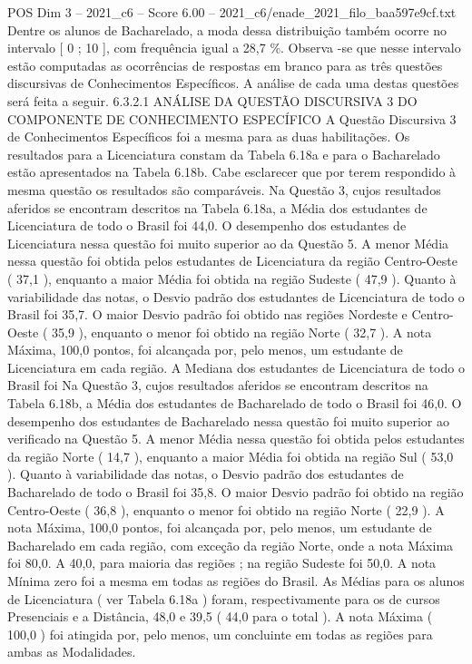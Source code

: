 \begin{textsample}{POS Dim 3 – 2021\_c6 – Score 6.00 – 2021\_c6/enade\_2021\_filo\_baa597e9cf.txt}
Dentre os alunos de Bacharelado, a moda dessa distribuição também ocorre no intervalo [ 0 ; 10 ], com frequência igual a 28,7 \%.
Observa -se que nesse intervalo estão computadas as ocorrências de respostas em branco para as três questões discursivas de Conhecimentos Específicos.
A análise de cada uma destas questões será feita a seguir. 6.3.2.1 ANÁLISE DA QUESTÃO DISCURSIVA 3 DO COMPONENTE DE CONHECIMENTO ESPECÍFICO A Questão Discursiva 3 de Conhecimentos Específicos foi a mesma para as duas habilitações.
Os resultados para a Licenciatura constam da Tabela 6.18a e para o Bacharelado estão apresentados na Tabela 6.18b.
Cabe esclarecer que por terem respondido à mesma questão os resultados são comparáveis.
Na Questão 3, cujos resultados aferidos se encontram descritos na Tabela 6.18a, a Média dos estudantes de Licenciatura de todo o Brasil foi 44,0.
O desempenho dos estudantes de Licenciatura nessa questão foi muito superior ao da Questão 5.
A menor Média nessa questão foi obtida pelos estudantes de Licenciatura da região Centro-Oeste ( 37,1 ), enquanto a maior Média foi obtida na região Sudeste ( 47,9 ).
Quanto à variabilidade das notas, o Desvio padrão dos estudantes de Licenciatura de todo o Brasil foi 35,7.
O maior Desvio padrão foi obtido nas regiões Nordeste e Centro-Oeste ( 35,9 ), enquanto o menor foi obtido na região Norte ( 32,7 ).
A nota Máxima, 100,0 pontos, foi alcançada por, pelo menos, um estudante de Licenciatura em cada região.
A Mediana dos estudantes de Licenciatura de todo o Brasil foi Na Questão 3, cujos resultados aferidos se encontram descritos na Tabela 6.18b, a Média dos estudantes de Bacharelado de todo o Brasil foi 46,0.
O desempenho dos estudantes de Bacharelado nessa questão foi muito superior ao verificado na Questão 5.
A menor Média nessa questão foi obtida pelos estudantes da região Norte ( 14,7 ), enquanto a maior Média foi obtida na região Sul ( 53,0 ).
Quanto à variabilidade das notas, o Desvio padrão dos estudantes de Bacharelado de todo o Brasil foi 35,8.
O maior Desvio padrão foi obtido na região Centro-Oeste ( 36,8 ), enquanto o menor foi obtido na região Norte ( 22,9 ).
A nota Máxima, 100,0 pontos, foi alcançada por, pelo menos, um estudante de Bacharelado em cada região, com exceção da região Norte, onde a nota Máxima foi 80,0.
A 40,0, para maioria das regiões ; na região Sudeste foi 50,0.
A nota Mínima zero foi a mesma em todas as regiões do Brasil.
As Médias para os alunos de Licenciatura ( ver Tabela 6.18a ) foram, respectivamente para os de cursos Presenciais e a Distância, 48,0 e 39,5 ( 44,0 para o total ).
A nota Máxima ( 100,0 ) foi atingida por, pelo menos, um concluinte em todas as regiões para ambas as Modalidades.

\end{textsample}
